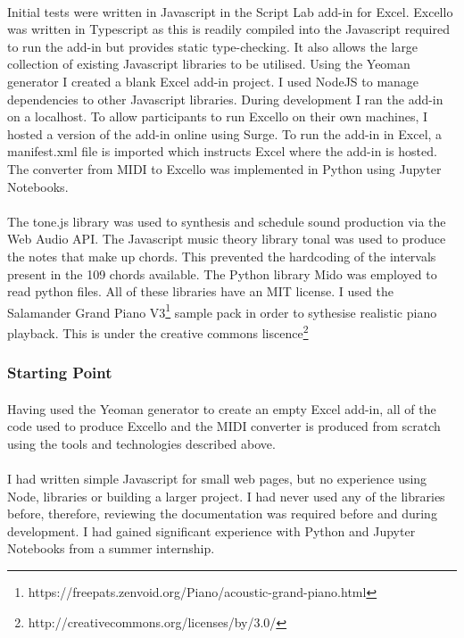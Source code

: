 \paragraph{} Initial tests were written in Javascript in the Script Lab add-in for Excel. Excello was written in Typescript as this is readily compiled into the Javascript required to run the add-in but provides static type-checking. It also allows the large collection of existing Javascript libraries to be utilised. Using the Yeoman generator I created a blank Excel add-in project. I used NodeJS to manage dependencies to other Javascript libraries. During development I ran the add-in on a localhost. To allow participants to run Excello on their own machines, I hosted a version of the add-in online using Surge. To run the add-in in Excel, a manifest.xml file is imported which instructs Excel where the add-in is hosted. The converter from MIDI to Excello was implemented in Python using Jupyter Notebooks.

\paragraph{} The tone.js library was used to synthesis and schedule sound production via the Web Audio API. The Javascript music theory library tonal was used to produce the notes that make up chords. This prevented the hardcoding of the intervals present in the 109 chords available. The Python library Mido was employed to read python files. All of these libraries have an MIT license. I used the Salamander Grand Piano V3\footnote{https://freepats.zenvoid.org/Piano/acoustic-grand-piano.html} sample pack in order to sythesise realistic piano playback. This is under the creative commons liscence\footnote{http://creativecommons.org/licenses/by/3.0/}

\subsubsection{Starting Point}

\paragraph{} Having used the Yeoman generator to create an empty Excel add-in, all of the code used to produce Excello and the MIDI converter is produced from scratch using the tools and technologies described above.

\paragraph{} I had written simple Javascript for small web pages, but no experience using Node, libraries or building a larger project. I had never used any of the libraries before, therefore, reviewing the documentation was required before and during development. I had gained significant experience with Python and Jupyter Notebooks from a summer internship.

